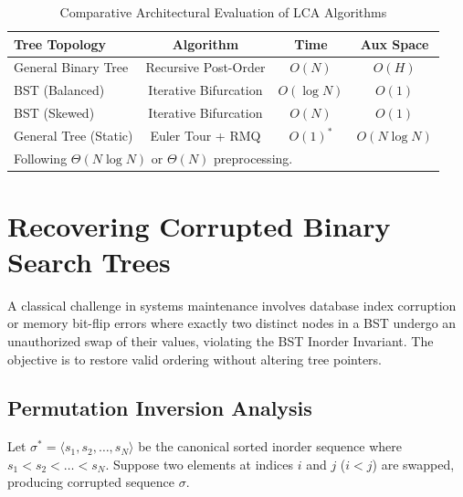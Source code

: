 \documentclass[10pt,twocolumn,letterpaper]{article}
\begin{document}
\begin{table}[h]
\centering
\caption{Comparative Architectural Evaluation of LCA Algorithms}
\label{tab:lca-eval}
\begin{tabular}{lccc}
\toprule
\textbf{Tree Topology} & \textbf{Algorithm} & \textbf{Time} & \textbf{Aux Space} \\
\midrule
General Binary Tree & Recursive Post-Order & $O(N)$ & $O(H)$ \\
BST (Balanced) & Iterative Bifurcation & $O(\log N)$ & $O(1)$ \\
BST (Skewed) & Iterative Bifurcation & $O(N)$ & $O(1)$ \\
General Tree (Static) & Euler Tour + RMQ & $O(1)^*$ & $O(N \log N)$ \\
\bottomrule
\multicolumn{4}{l}{\footnotesize *Following $\Theta(N \log N)$ or $\Theta(N)$ preprocessing.}
\end{tabular}
\end{table}

\section{Recovering Corrupted Binary Search Trees}
\label{sec:recovery}

A classical challenge in systems maintenance involves database index corruption or memory bit-flip errors where exactly two distinct nodes in a BST undergo an unauthorized swap of their values, violating the BST Inorder Invariant. The objective is to restore valid ordering without altering tree pointers.

\subsection{Permutation Inversion Analysis}

Let $\sigma^* = \langle s_1, s_2, \dots, s_N \rangle$ be the canonical sorted inorder sequence where $s_1 < s_2 < \dots < s_N$. Suppose two elements at indices $i$ and $j$ ($i < j$) are swapped, producing corrupted sequence $\sigma$.
\end{document}
